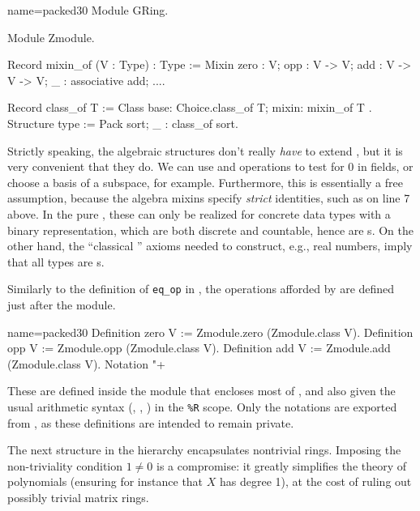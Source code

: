 \begin{coq}{name=packed30}{}
Module GRing.

Module Zmodule.

Record mixin_of (V : Type) : Type := Mixin {
  zero : V; opp : V -> V; add : V -> V -> V;
  _ : associative add;
  ...}.

Record class_of T := Class { base: Choice.class_of T; mixin: mixin_of T }.
Structure type := Pack {sort; _ : class_of sort}.
\end{coq}

Strictly speaking, the \mcbMC{} algebraic structures don't really
\emph{have} to extend , but it is very convenient that
they do.  We can use  and  operations to test
for 0 in fields, or choose a basis of a subspace, for example.
Furthermore, this is essentially a free assumption, because the
\mcbMC{} algebra mixins specify \emph{strict} identities, such as
 on line 7 above. In the pure \mcbCIC{}, these can only
be realized for concrete data types with a binary representation,
which are both discrete and countable, hence are s.  On
the other hand, the ``classical \mcbCIC{}'' axioms needed to construct,
e.g., real numbers, imply that all types are s.

Similarly to the definition of \lstinline/eq_op/ in , the
operations afforded by  are defined just after the
 module.

\begin{coq}{name=packed30}{}
Definition zero V := Zmodule.zero (Zmodule.class V).
Definition opp V := Zmodule.opp (Zmodule.class V).
Definition add V := Zmodule.add (Zmodule.class V).
Notation "+%
\end{coq}

These are defined inside the  module that encloses most of
, and also given the usual arithmetic syntax (,
, ) in the \lstinline/%R/
scope. Only the notations are
exported from , as these definitions are intended to remain
private.


The next structure in the hierarchy encapsulates nontrivial rings.
Imposing the non-triviality condition $1 \neq 0$ is a compromise:
it greatly simplifies the theory of polynomials (ensuring for instance that
$X$ has degree 1), at the cost of ruling out possibly trivial matrix rings.

